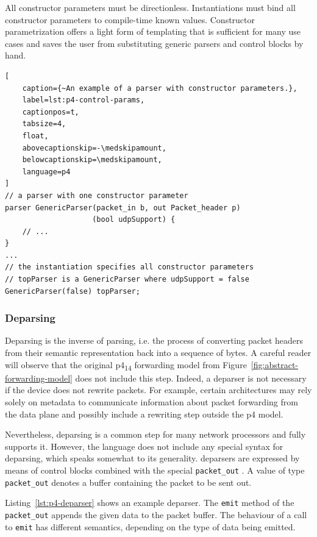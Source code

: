 All constructor parameters must be directionless. Instantiations must bind all
constructor parameters to compile-time known values. Constructor parametrization
offers a light form of templating that is sufficient for many use cases and
saves the user from substituting generic parsers and control blocks by hand.

\begin{lstlisting}[
	caption={~An example of a parser with constructor parameters.},
	label=lst:p4-control-params,
	captionpos=t,
	tabsize=4,
	float,
	abovecaptionskip=-\medskipamount,
	belowcaptionskip=\medskipamount,
	language=p4
]
// a parser with one constructor parameter
parser GenericParser(packet_in b, out Packet_header p)
                    (bool udpSupport) {
	// ...
}
...
// the instantiation specifies all constructor parameters
// topParser is a GenericParser where udpSupport = false
GenericParser(false) topParser;
\end{lstlisting}


\subsubsection*{Deparsing} \label{sec:p4-deparsing}

Deparsing is the inverse of parsing, i.e. the process of converting packet
headers from their semantic representation back into a sequence of bytes. A
careful reader will observe that the original \acrshort{p4}\textsubscript{14}
forwarding model from Figure~\ref{fig:abstract-forwarding-model} does not
include this step. Indeed, a deparser is not necessary if the device does not
rewrite packets. For example, certain architectures may rely solely on metadata
to communicate information about packet forwarding from the data plane and
possibly include a rewriting step outside the \acrshort{p4} model.

Nevertheless, deparsing is a common step for many network processors and \pfs
fully supports it. However, the language does not include any special syntax for
deparsing, which speaks somewhat to its generality. \pfs deparsers are expressed
by means of control blocks combined with the special \texttt{packet\_out}
\extern. A value of type \texttt{packet\_out} denotes a buffer containing the
packet to be sent out.

Listing~\ref{lst:p4-deparser} shows an example deparser. The \texttt{emit}
method of the \texttt{packet\_out} \extern{} appends the given data to the
packet buffer. The behaviour of a call to \texttt{emit} has different semantics,
depending on the type of data being emitted.

